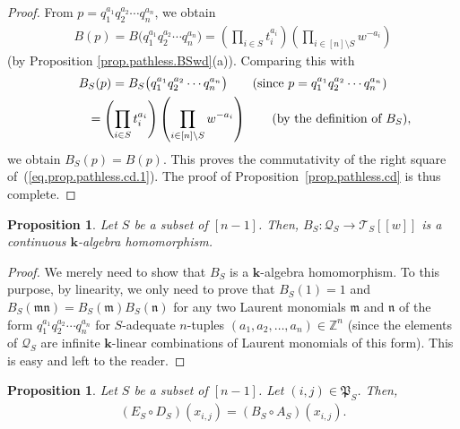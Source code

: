 \documentclass[11pt]{article}
\newtheorem{Proposition}[Theorem]{Proposition}
\numberwithin{equation}{section}
\let\prodnonlimits\prod
\renewcommand{\prod}{\prodnonlimits\limits}
\begin{document}
\begin{proof}
From $p=q_{1}^{a_{1}}q_{2}^{a_{2}}\cdots q_{n}^{a_{n}}$, we obtain
\begin{gather*}
B(p) =B\big( q_{1}^{a_{1}}q_{2}^{a_{2}}\cdots q_{n}^{a_{n}}\big) =\left( \prod_{i\in S}t_{i}^{a_{i}}\right) \left( \prod _{i\in[n] \setminus S}w^{-a_{i}}\right)
\end{gather*}
(by Proposition \ref{prop.pathless.BSwd}(a)). Comparing this with
\begin{gather*}
B_{S}(p)=B_{S}\big( q_{1}^{a_{1}}q_{2}^{a_{2}}\cdots q_{n}^{a_{n}}\big) \qquad ( \text{since }p=q_{1}^{a_{1}}q_{2}^{a_{2}}\cdots q_{n}^{a_{n}}) \\
\hphantom{B_{S}(p)}{} =\left( \prod_{i\in S}t_{i}^{a_{i}}\right) \left( \prod_{i\in [n] \setminus S}w^{-a_{i}}\right) \qquad ( \text{by the definition of }B_{S}) ,
\end{gather*}
we obtain $B_{S}(p) =B(p) $. This proves the commutativity of the right square of~(\ref{eq.prop.pathless.cd.1}). The proof of Proposition~\ref{prop.pathless.cd} is thus complete.
\end{proof}

\begin{Proposition}\label{prop.pathless.BS-alg}Let $S$ be a subset of $[n-1] $. Then, $B_{S}\colon \mathcal{Q}_{S}\rightarrow\mathcal{T}_{S} [ [ w] ] $ is a continuous $\mathbf{k}$-algebra homomorphism.
\end{Proposition}

\begin{proof}We merely need to show that $B_{S}$ is a $\mathbf{k}$-algebra homomorphism. To this purpose, by linearity, we only need to prove that $B_{S}(1) =1$ and $B_{S}( \mathfrak{mn}) =B_{S}( \mathfrak{m}) B_{S}(\mathfrak{n}) $ for any two Laurent monomials $\mathfrak{m}$ and $\mathfrak{n}$ of the form $q_{1}^{a_{1}}q_{2}^{a_{2}}\cdots q_{n}^{a_{n}}$ for $S$-adequate $n$-tuples $( a_{1},a_{2},\ldots,a_{n}) \in\mathbb{Z}^{n}$ (since the elements of $\mathcal{Q}_{S}$ are infinite $\mathbf{k}$-linear combinations of Laurent monomials of this form). This is easy and left to the reader.
\end{proof}

\begin{Proposition}\label{prop.pathless.AB}Let $S$ be a subset of $[n-1] $. Let $(i,j) \in\mathfrak{P}_{S}$. Then,
\begin{gather*}
 ( E_{S}\circ D_{S} ) (x_{i,j}) = ( B_{S}\circ A_{S} ) ( x_{i,j} ) .
\end{gather*}
\end{Proposition}
\end{document}
